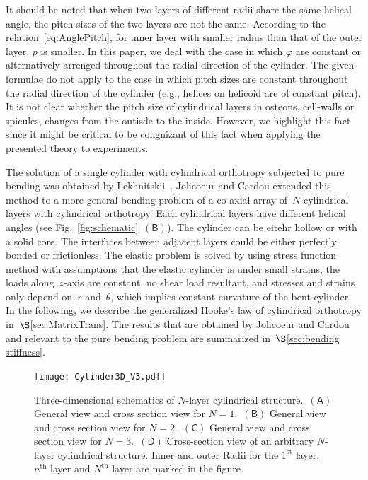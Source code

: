 \documentclass[preprint,12pt,times,draft]{elsarticle}
\numberwithin{equation}{section}
\newcommand{\pr}[1]{\left( #1 \right)}
\newcommand{\subf}[1]{\pr{\textsf{#1}}}
\renewcommand{\>}{$\Rightarrow$}
\begin{document}
It should be noted that when two layers of different radii share the same helical angle, the pitch sizes of the two layers are not the same. According to the relation~\eqref{eq:AnglePitch}, for inner layer with smaller radius than that of the outer layer, $p$ is smaller. In this paper, we deal with the case in which $\varphi$ are constant or alternatively arrenged throughout the radial direction of the cylinder. The given formulae do not apply to the case in which pitch sizes are constant throughout the radial direction of the cylinder (e.g., helices on helicoid are of constant pitch). It is not clear whether the pitch size of cylindrical layers in osteons, cell-walls or spicules, changes from the outisde to the inside. However, we highlight this fact since it might be critical to be congnizant of this fact when applying the presented theory to experiments.

The solution of a single cylinder with cylindrical orthotropy subjected to pure bending was obtained by Lekhnitskii~\cite{Lekhnitskii1981}. Jolicoeur and Cardou extended this method to a more general bending problem of a co-axial array of~$N$ cylindrical layers with cylindrical orthotropy. Each cylindrical layers have different helical angles (see Fig.~\ref{fig:schematic}~$\subf{B}$). The cylinder can be eitehr hollow or with a solid core. The interfaces between adjacent layers could be either perfectly bonded or frictionless. The elastic problem is solved by using stress function method with assumptions that the elastic cylinder is under small strains, the loads along~$z$-axis are constant, no shear load resultant, and stresses and strains only depend on~$r$ and~$\theta$, which implies constant curvature of the bent cylinder. In the following, we describe the generalized Hooke's law of cylindrical orthotropy in~$\S$\ref{sec:MatrixTrans}. The results that are obtained by Jolicoeur and Cardou and relevant to the pure bending problem are summarized in~$\S$\ref{sec:bending stiffness}.


\begin{figure}[t]
  \centering
  \graphicspath{{../LyxFiles/figure/}}
   \texttt{[image: Cylinder3D\_V3.pdf]}
  \caption{Three-dimensional schematics of  $N$-layer cylindrical structure.~$\subf{A}$ General view and cross section view for $N = 1$.~$\subf{B}$ General view and cross section view for $N = 2$.~$\subf{C}$ General view and cross section view for $N = 3$.~$\subf{D}$ Cross-section view of an arbitrary $N$-layer cylindrical structure. Inner and outer Radii for the $1^\text{st}$ layer, $n^\text{th}$ layer and $N^\text{th}$ layer are marked in the figure.}
  \label{fig:Cylinder3D}
\end{figure}
\end{document}
